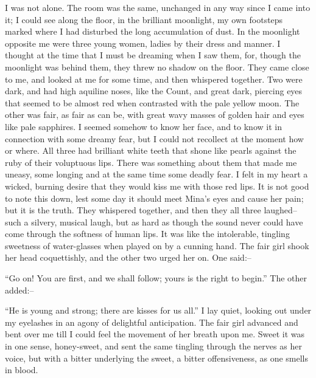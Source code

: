 \documentclass[12pt,openright]{book}
\begin{document}
I was not alone. The room was the same, unchanged in any way since I came into it; I could see along the floor, in the brilliant moonlight, my own footsteps marked where I had disturbed the long accumulation of dust. In the moonlight opposite me were three young women, ladies by their dress and manner. I thought at the time that I must be dreaming when I saw them, for, though the moonlight was behind them, they threw no shadow on the floor. They came close to me, and looked at me for some time, and then whispered together. Two were dark, and had high aquiline noses, like the Count, and great dark, piercing eyes that seemed to be almost red when contrasted with the pale yellow moon. The other was fair, as fair as can be, with great wavy masses of golden hair and eyes like pale sapphires. I seemed somehow to know her face, and to know it in connection with some dreamy fear, but I could not recollect at the moment how or where. All three had brilliant white teeth that shone like pearls against the ruby of their voluptuous lips. There was something about them that made me uneasy, some longing and at the same time some deadly fear. I felt in my heart a wicked, burning desire that they would kiss me with those red lips. It is not good to note this down, lest some day it should meet Mina’s eyes and cause her pain; but it is the truth. They whispered together, and then they all three laughed–such a silvery, musical laugh, but as hard as though the sound never could have come through the softness of human lips. It was like the intolerable, tingling sweetness of water-glasses when played on by a cunning hand. The fair girl shook her head coquettishly, and the other two urged her on. One said:–

“Go on! You are first, and we shall follow; yours is the right to begin.” The other added:–

“He is young and strong; there are kisses for us all.” I lay quiet, looking out under my eyelashes in an agony of delightful anticipation. The fair girl advanced and bent over me till I could feel the movement of her breath upon me. Sweet it was in one sense, honey-sweet, and sent the same tingling through the nerves as her voice, but with a bitter underlying the sweet, a bitter offensiveness, as one smells in blood.
\end{document}
